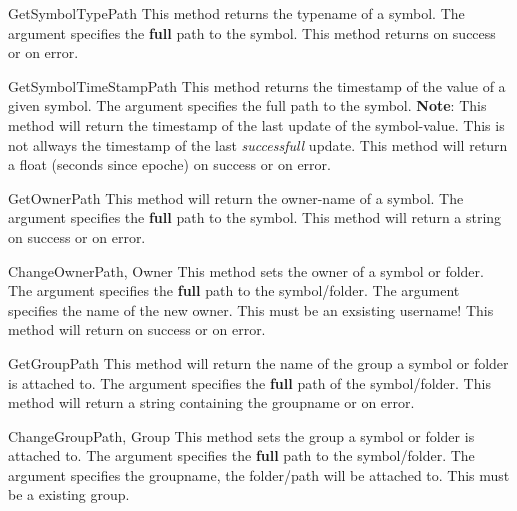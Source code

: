 \begin{methoddesc}[System]{GetSymbolType}{Path}
This method returns the typename of a symbol. The argument  
specifies the \textbf{full} path to the symbol. This method returns 
 on success or  on error.
\end{methoddesc}


\begin{methoddesc}[System]{GetSymbolTimeStamp}{Path}
This method returns the timestamp of the value of a given symbol. The argument
 specifies the full path to the symbol. \textbf{Note}: This method
will return the timestamp of the last update of the symbol-value. This is not 
allways the timestamp of the last \emph{successfull} update. This method will 
return a float (seconds since epoche) on success or  on error.
\end{methoddesc}


\begin{methoddesc}[System]{GetOwner}{Path}
This method will return the owner-name of a symbol. The argument
 specifies the \textbf{full} path to the symbol. This method will
return a string on success or  on error.
\end{methoddesc}


\begin{methoddesc}[System]{ChangeOwner}{Path, Owner}
This method sets the owner of a symbol or folder. The argument  
specifies the \textbf{full} path to the symbol/folder. The argument 
 specifies the name of the new owner. This must be an exsisting 
username! This method will return  on success or  on
error.
\end{methoddesc}


\begin{methoddesc}[System]{GetGroup}{Path}
This method will return the name of the group a symbol or folder is attached 
to. The argument  specifies the \textbf{full} path of the 
symbol/folder. This method will return a string containing the groupname
or  on error.
\end{methoddesc}


\begin{methoddesc}[System]{ChangeGroup}{Path, Group}
This method sets the group a symbol or folder is attached to. The argument
 specifies the \textbf{full} path to the symbol/folder. The argument
 specifies the groupname, the folder/path will be attached to. This
must be a existing group.
\end{methoddesc}


